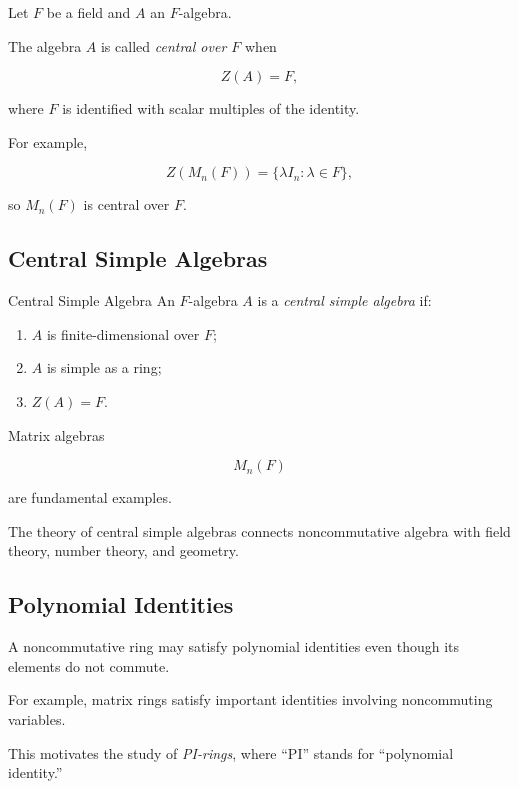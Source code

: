 Let \(F\) be a field and \(A\) an \(F\)-algebra.

The algebra \(A\) is called \emph{central over \(F\)} when

\[ Z(A)=F, \]

where \(F\) is identified with scalar multiples of the identity.

For example,

\[ Z(M_n(F))=\{\lambda I_n:\lambda\in F\}, \]

so \(M_n(F)\) is central over \(F\).

\subsection{Central Simple Algebras}
\label{subsec:central-simple-algebras}

\begin{definitionbox}{Central Simple Algebra}
An \(F\)-algebra \(A\) is a \emph{central simple algebra} if:
\begin{enumerate}
    \item \(A\) is finite-dimensional over \(F\);
    \item \(A\) is simple as a ring;
    \item \(Z(A)=F\).
\end{enumerate}
\end{definitionbox}

Matrix algebras

\[ M_n(F) \]

are fundamental examples.

The theory of central simple algebras connects noncommutative algebra with
field theory, number theory, and geometry.

\subsection{Polynomial Identities}
\label{subsec:polynomial-identities}

A noncommutative ring may satisfy polynomial identities even though its
elements do not commute.

For example, matrix rings satisfy important identities involving
noncommuting variables.

This motivates the study of \emph{PI-rings}, where ``PI'' stands for
``polynomial identity.''

